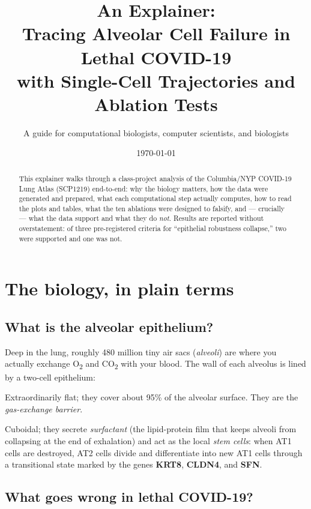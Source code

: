 \documentclass[11pt]{article}
\title{An Explainer:\\
Tracing Alveolar Cell Failure in Lethal COVID-19\\
with Single-Cell Trajectories and Ablation Tests}
\author{A guide for computational biologists, computer scientists, and biologists}
\date{\today}
\begin{document}
\maketitle

\begin{abstract}
\noindent This explainer walks through a class-project analysis of the Columbia/NYP COVID-19 Lung Atlas (SCP1219) end-to-end: why the biology matters, how the data were generated and prepared, what each computational step actually computes, how to read the plots and tables, what the ten ablations were designed to falsify, and --- crucially --- what the data support and what they do \emph{not}. Results are reported without overstatement: of three pre-registered criteria for ``epithelial robustness collapse,'' two were supported and one was not.
\end{abstract}

\tableofcontents
\bigskip

\section{The biology, in plain terms}

\subsection{What is the alveolar epithelium?}

Deep in the lung, roughly 480 million tiny air sacs (\emph{alveoli}) are where you actually exchange O\textsubscript{2} and CO\textsubscript{2} with your blood. The wall of each alveolus is lined by a two-cell epithelium:

\begin{description}[style=nextline]
\item[AT1 (alveolar type I) cells] Extraordinarily flat; they cover about 95\% of the alveolar surface. They are the \emph{gas-exchange barrier}.
\item[AT2 (alveolar type II) cells] Cuboidal; they secrete \emph{surfactant} (the lipid-protein film that keeps alveoli from collapsing at the end of exhalation) and act as the local \emph{stem cells}: when AT1 cells are destroyed, AT2 cells divide and differentiate into new AT1 cells through a transitional state marked by the genes \textbf{KRT8}, \textbf{CLDN4}, and \textbf{SFN}.
\end{description}

\subsection{What goes wrong in lethal COVID-19?}
\end{document}
